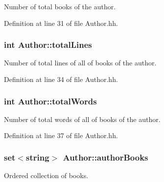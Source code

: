 Number of total books of the author. 



Definition at line 31 of file Author.\+hh.

\subsubsection[{\texorpdfstring{total\+Lines}{totalLines}}]{\setlength{\rightskip}{0pt plus 5cm}int Author\+::total\+Lines\hspace{0.3cm}{\ttfamily [private]}}\hypertarget{class_author_a8d818414bbd909287641b388601bf61a}{}\label{class_author_a8d818414bbd909287641b388601bf61a}


Number of total lines of all of books of the author. 



Definition at line 34 of file Author.\+hh.

\subsubsection[{\texorpdfstring{total\+Words}{totalWords}}]{\setlength{\rightskip}{0pt plus 5cm}int Author\+::total\+Words\hspace{0.3cm}{\ttfamily [private]}}\hypertarget{class_author_a478c72fff965eb1ee8fcaddfe173715b}{}\label{class_author_a478c72fff965eb1ee8fcaddfe173715b}


Number of total words of all of books of the author. 



Definition at line 37 of file Author.\+hh.

\subsubsection[{\texorpdfstring{author\+Books}{authorBooks}}]{\setlength{\rightskip}{0pt plus 5cm}set$<$string$>$ Author\+::author\+Books\hspace{0.3cm}{\ttfamily [private]}}\hypertarget{class_author_ad9ffe450cdafed2242936f6fcafa22b4}{}\label{class_author_ad9ffe450cdafed2242936f6fcafa22b4}


Ordered collection of books. 


